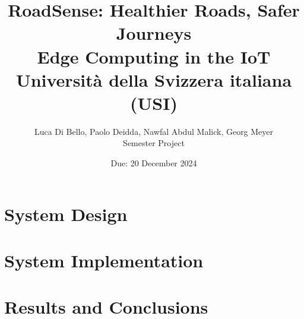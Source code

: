 \documentclass[12pt,a4paper]{report}
\title{RoadSense: Healthier Roads, Safer Journeys \\ \vspace{0.5em}
\Large Edge Computing in the IoT \\ Università della Svizzera italiana (USI)}
\author{Luca Di Bello, Paolo Deidda, Nawfal Abdul Malick, Georg Meyer \\[1em]
Semester Project}
\date{Due: 20 December 2024}
\begin{document}
\maketitle

\tableofcontents
\listoffigures

\chapter{System Design}





\chapter{System Implementation}







\chapter{Results and Conclusions}






\end{document}
